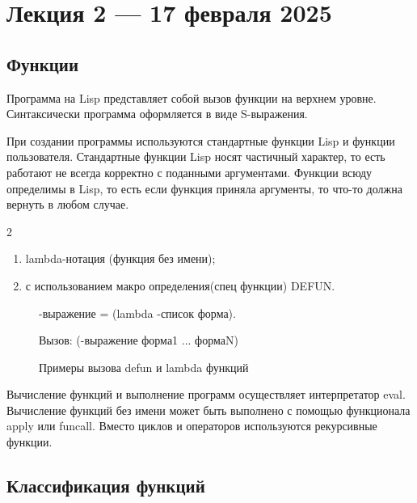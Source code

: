 \chapter{Лекция 2 — 17 февраля 2025}

\section{Функции}

Программа на Lisp представляет собой вызов функции на верхнем уровне.
Синтаксически программа оформляется в виде S-выражения. 

При создании программы используются стандартные функции Lisp и функции пользователя. 
Стандартные функции Lisp носят частичный характер,
то есть работают не всегда корректно с поданными аргументами.
Функции всюду определимы в Lisp, то есть если функция приняла 
аргументы, то что-то должна вернуть в любом случае.

\begin{listbox}{\noindent \begin{listboxtitle}{}2\end{listboxtitle} 
    }
\begin{enumerate}
	\item lambda-нотация (функция без имени);
	\item с использованием макро определения(спец функции) DEFUN.
\end{enumerate}
\end{listbox}

\begin{figure}[H]
    \begin{listingbox}{}
        

        \textlambda-выражение  = (lambda \textlambda-список форма).

        Вызов: (\textlambda-выражение форма1 ... формаN)
    \end{listingbox}
    \caption{Примеры вызова defun и lambda функций}
    \label{lst:lambda-defun-example}
\end{figure}

Вычисление функций и выполнение программ осуществляет интерпретатор eval.
Вычисление функций без имени может быть выполнено с помощью функционала apply или funcall.
Вместо циклов и операторов используются рекурсивные функции.

\section{Классификация функций}

